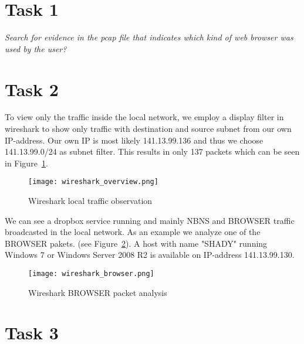 \documentclass[12pt]{article}
\begin{document}
\maketitle


\section{Task 1}\label{task1}
\emph{Search for evidence in the pcap file that indicates which kind of web browser was
used by the user?}


\section{Task 2}\label{task2}
To view only the traffic inside the local network, we employ a display filter in wireshark to show only traffic with destination and source subnet from our own IP-address. Our own IP is most likely 141.13.99.136 and thus we choose 141.13.99.0/24 as subnet filter. This results in only 137 packets which can be seen in Figure~\ref{img_wireshark_overview}.

\begin{figure}[h]%
\centering%
\texttt{[image: wireshark\_overview.png]}%
\caption{Wireshark local traffic observation}%
\label{img_wireshark_overview}%
\end{figure}%


We can see a dropbox service running and mainly NBNS and BROWSER traffic broadcasted in the local network. As an example we analyze one of the BROWSER pakets. (see Figure~\ref{img_wireshark_browser}).
A host with name "SHADY" running Windows 7 or Windows Server 2008 R2 is available on IP-address 141.13.99.130.

\begin{figure}[h]%
\centering%
\texttt{[image: wireshark\_browser.png]}%
\caption{Wireshark BROWSER packet analysis}%
\label{img_wireshark_browser}%
\end{figure}%


\section{Task 3}\label{task3}
\end{document}
